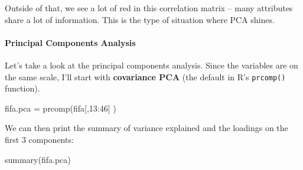 \documentclass[
]{article}
\newenvironment{Shaded}{\begin{snugshade}}{\end{snugshade}}
\newcommand{\DecValTok}[1]{\textcolor[rgb]{0.00,0.00,0.81}{#1}}
\newcommand{\FunctionTok}[1]{\textcolor[rgb]{0.00,0.00,0.00}{#1}}
\newcommand{\NormalTok}[1]{#1}
\newcommand{\OtherTok}[1]{\textcolor[rgb]{0.56,0.35,0.01}{#1}}
\newcommand{\SpecialCharTok}[1]{\textcolor[rgb]{0.00,0.00,0.00}{#1}}
\theoremstyle{definition}
\theoremstyle{definition}
\theoremstyle{definition}
\theoremstyle{definition}
\theoremstyle{remark}
\begin{document}
Outside of that, we see a lot of red in this correlation matrix -- many attributes share a lot of information. This is the type of situation where PCA shines.

\hypertarget{principal-components-analysis}{%
\paragraph{Principal Components Analysis}\label{principal-components-analysis}}

Let's take a look at the principal components analysis. Since the variables are on the same scale, I'll start with \textbf{covariance PCA} (the default in R's \texttt{prcomp()} function).

\begin{Shaded}
\begin{Highlighting}[]
\NormalTok{fifa.pca }\OtherTok{=} \FunctionTok{prcomp}\NormalTok{(fifa[,}\DecValTok{13}\SpecialCharTok{:}\DecValTok{46}\NormalTok{] )}
\end{Highlighting}
\end{Shaded}

We can then print the summary of variance explained and the loadings on the first 3 components:

\begin{Shaded}
\begin{Highlighting}[]
\FunctionTok{summary}\NormalTok{(fifa.pca)}
\end{Highlighting}
\end{Shaded}
\end{document}
